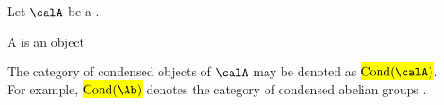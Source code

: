 \begin{definition} \label{definition:condensed_object_of_a_category}
    Let $\calA$ be a . 

    A  is an object   

    The category of condensed objects of $\calA$ may be denoted as \hl{$\operatorname{Cond}(\calA)$}. For example, \hl{$\operatorname{Cond}(\Ab)$} denotes the category of condensed abelian groups .
\end{definition}